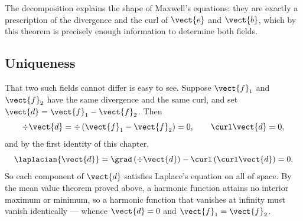 The decomposition explains the shape of Maxwell's equations: they are exactly a prescription of the divergence and the curl of $\vect{e}$ and $\vect{b}$, which by this theorem is precisely enough information to determine both fields.

\subsection{Uniqueness}

That two such fields cannot differ is easy to see. Suppose $\vect{f}_1$ and $\vect{f}_2$ have the same divergence and the same curl, and set $\vect{d} = \vect{f}_1 - \vect{f}_2$. Then
\[
    \div\vect{d} = \div\left(\vect{f}_1 - \vect{f}_2\right) = 0, \qquad \curl\vect{d} = 0,
\]
and by the first identity of this chapter,
\[
    \laplacian{\vect{d}} = \grad\left(\div\vect{d}\right) - \curl\left(\curl\vect{d}\right) = 0.
\]
So each component of $\vect{d}$ satisfies Laplace's equation on all of space. By the mean value theorem proved above, a harmonic function attains no interior maximum or minimum, so a harmonic function that vanishes at infinity must vanish identically --- whence $\vect{d} = 0$ and $\vect{f}_1 = \vect{f}_2$.
